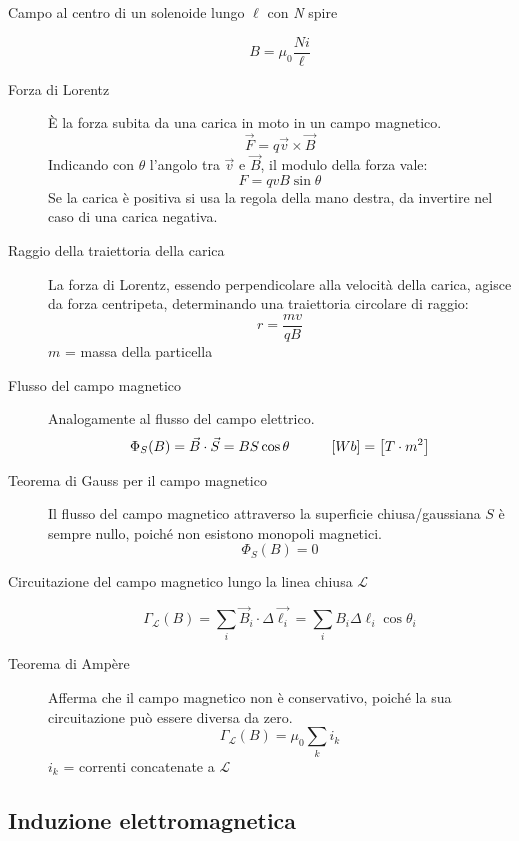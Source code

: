 \documentclass[a4paper,11pt,italian]{article}
\begin{document}
\begin{description}
  \item[Campo al centro di un solenoide lungo $ \ell $ con \textit{N} spire]
  \[ B = \mu_0 \frac{Ni}{\ell}\]
  
  \item[Forza di Lorentz] 
  È la forza subita da una carica in moto in un campo magnetico.
  \[ \vec{F} = q \vec{v} \times \vec{B} \]
  Indicando con $ \theta $ l'angolo tra $ \vec{v} $ e $ \vec{B} $, il modulo della forza vale:
  \[ F = qvB\sin \theta \]
  Se la carica è positiva si usa la regola della mano destra, da invertire nel caso di una carica negativa.
  
  \item[Raggio della traiettoria della carica] 
  La forza di Lorentz, essendo perpendicolare alla velocità della carica, agisce da forza centripeta, determinando una traiettoria circolare di raggio:
  \[ r = \frac{mv}{qB} \]
  $ m $ = massa della particella

  
  \item[Flusso del campo magnetico] 
  Analogamente al flusso del campo elettrico.
  \[ \Phi_S(B) = \vec{B} \cdot \vec{S} = B S \cos \theta \hspace*{3em} [Wb] = \left[ T \cdot m^2 \right] \]
  
  \item[Teorema di Gauss per il campo magnetico] 
  Il flusso del campo magnetico attraverso la superficie chiusa/gaussiana $ S $ è sempre nullo, poiché non esistono monopoli magnetici.
  \[ \Phi_S(B) = 0 \]
  
  \item[Circuitazione del campo magnetico lungo la linea chiusa $ \mathscr{L} $]\label{conc:circuitazioneB}
  \[ \Gamma_\mathscr{L}(B) = \sum_i \vec{B}_i \cdot \Delta\vec{\ell_i} = \sum_i B_i \Delta \ell_i \cos \theta_i \]
  
  \item[Teorema di Ampère] 
  Afferma che il campo magnetico non è conservativo, poiché la sua circuitazione può essere diversa da zero.
  \[ \Gamma_\mathscr{L}(B) = \mu_0 \sum_k i_k \]
  $ i_k $ = correnti concatenate a $ \mathscr{L} $
\end{description}

\subsection{Induzione elettromagnetica}
\end{document}
